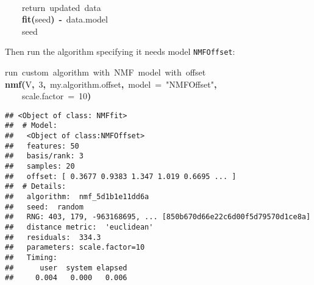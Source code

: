 \documentclass[a4paper]{article}\usepackage{graphicx, color}
\makeatletter
\newcommand{\hlnumber}[1]{\textcolor[rgb]{0,0,0}{#1}}%
\newcommand{\hlfunctioncall}[1]{\textcolor[rgb]{0.501960784313725,0,0.329411764705882}{\textbf{#1}}}%
\newcommand{\hlstring}[1]{\textcolor[rgb]{0.6,0.6,1}{#1}}%
\newcommand{\hlkeyword}[1]{\textcolor[rgb]{0,0,0}{\textbf{#1}}}%
\newcommand{\hlargument}[1]{\textcolor[rgb]{0.690196078431373,0.250980392156863,0.0196078431372549}{#1}}%
\newcommand{\hlcomment}[1]{\textcolor[rgb]{0.180392156862745,0.6,0.341176470588235}{#1}}%
\newcommand{\hlassignement}[1]{\textcolor[rgb]{0,0,0}{\textbf{#1}}}%
\newcommand{\hlsymbol}[1]{\textcolor[rgb]{0,0,0}{#1}}%
\newcommand{\hlstd}[1]{\textcolor[rgb]{0,0,0}{#1}}%
\newenvironment{kframe}{%
 \def\FrameCommand##1{\hskip\@totalleftmargin \hskip-\fboxsep
 \colorbox{shadecolor}{##1}\hskip-\fboxsep
     \hskip-\linewidth \hskip-\@totalleftmargin \hskip\columnwidth}%
 \MakeFramed {\advance\hsize-\width
   \@totalleftmargin\z@ \linewidth\hsize
   \@setminipage}}%
 {\par\unskip\endMakeFramed}
\newenvironment{knitrout}{}{} %
\let\code=\texttt
\makeatother
\begin{document}
\begin{knitrout}
\begin{kframe}
\begin{flushleft}
\hlstd{}\hspace*{\fill}\\
\hlstd{}{\ }{\ }{\ }{\ }\hlcomment{\usebox{\hlnormalsizeboxhash}{\ }return{\ }updated{\ }data}\hspace*{\fill}\\
\hlstd{}{\ }{\ }{\ }{\ }\hlfunctioncall{fit}\hlkeyword{(}\hlsymbol{seed}\hlkeyword{)}{\ }\hlassignement{\usebox{\hlnormalsizeboxlessthan}-}{\ }\hlsymbol{data.model}\hspace*{\fill}\\
\hlstd{}{\ }{\ }{\ }{\ }\hlsymbol{seed}\hspace*{\fill}\\
\hlstd{}\hlkeyword{\usebox{\hlnormalsizeboxclosebrace}}\mbox{}
\normalfont
\end{flushleft}
\end{kframe}
\end{knitrout}


Then run the algorithm specifying it needs model \code{NMFOffset}:
\begin{knitrout}
\color{fgcolor}\begin{kframe}
\begin{flushleft}
\ttfamily\noindent
\hlcomment{\usebox{\hlnormalsizeboxhash}{\ }run{\ }custom{\ }algorithm{\ }with{\ }NMF{\ }model{\ }with{\ }offset}\hspace*{\fill}\\
\hlstd{}\hlfunctioncall{nmf}\hlkeyword{(}\hlsymbol{V}\hlkeyword{,}{\ }\hlnumber{3}\hlkeyword{,}{\ }\hlsymbol{my.algorithm.offset}\hlkeyword{,}{\ }\hlargument{model}{\ }\hlargument{=}{\ }\hlstring{"{}NMFOffset"{}}\hlkeyword{,}\hspace*{\fill}\\
\hlstd{}{\ }{\ }{\ }{\ }\hlargument{scale.factor}{\ }\hlargument{=}{\ }\hlnumber{10}\hlkeyword{)}\mbox{}
\normalfont
\end{flushleft}
\begin{verbatim}
## <Object of class: NMFfit>
##  # Model:
##   <Object of class:NMFOffset>
##   features: 50 
##   basis/rank: 3 
##   samples: 20 
##   offset: [ 0.3677 0.9383 1.347 1.019 0.6695 ... ]
##  # Details:
##   algorithm:  nmf_5d1b1e11dd6a 
##   seed:  random 
##   RNG: 403, 179, -963168695, ... [850b670d66e22c6d00f5d79570d1ce8a]
##   distance metric:  'euclidean' 
##   residuals:  334.3 
##   parameters: scale.factor=10 
##   Timing:
##      user  system elapsed 
##     0.004   0.000   0.006 
\end{verbatim}
\end{kframe}
\end{knitrout}
\end{document}

